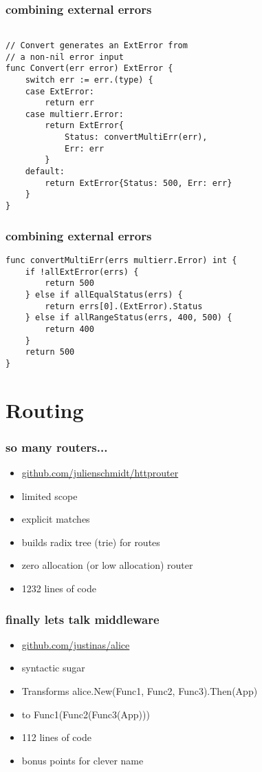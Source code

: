 \documentclass{beamer}
\begin{document}
\begin{frame}[fragile]
\frametitle{combining external errors}
\begin{lstlisting}[basicstyle=\ttfamily\footnotesize]

// Convert generates an ExtError from
// a non-nil error input
func Convert(err error) ExtError {
	switch err := err.(type) {
	case ExtError:
		return err
	case multierr.Error:
		return ExtError{
			Status: convertMultiErr(err),
			Err: err
		}
	default:
		return ExtError{Status: 500, Err: err}
	}
}
\end{lstlisting}
\end{frame}

\begin{frame}[fragile]
\frametitle{combining external errors}
\begin{lstlisting}[basicstyle=\ttfamily\footnotesize]
func convertMultiErr(errs multierr.Error) int {
	if !allExtError(errs) {
		return 500
	} else if allEqualStatus(errs) {
		return errs[0].(ExtError).Status
	} else if allRangeStatus(errs, 400, 500) {
		return 400
	}
	return 500
}
\end{lstlisting}
\end{frame}

\section{Routing}

\begin{frame}[fragile]
\frametitle{so many routers...}
\begin{itemize}
\item \href{https://github.com/julienschmidt/httprouter}{github.com/julienschmidt/httprouter}
\item limited scope
\item explicit matches
\item builds radix tree (trie) for routes
\item zero allocation (or low allocation) router
\item 1232 lines of code
\end{itemize}
\end{frame}

\begin{frame}[fragile]
\frametitle{finally lets talk middleware}
\begin{itemize}
\item \href{https://github.com/justinas/alice}{github.com/justinas/alice}
\item syntactic sugar
\item Transforms alice.New(Func1, Func2, Func3).Then(App)
\item to Func1(Func2(Func3(App)))
\item 112 lines of code
\item bonus points for clever name
\end{itemize}
\end{frame}	
\end{document}
